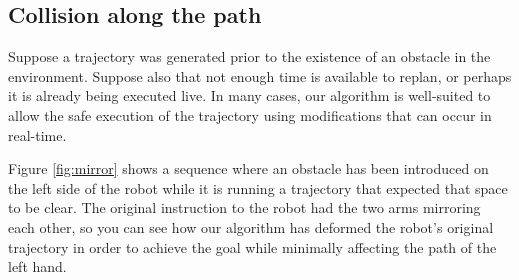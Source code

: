 \documentclass[letterpaper, 10 pt, conference]{ieeeconf}  %
\begin{document}
\subsection{Collision along the path}

Suppose a trajectory was generated prior to the existence of an obstacle in the environment. Suppose also that not enough time is available to replan, or perhaps it is already being executed live. In many cases, our algorithm is well-suited to allow the safe execution of the trajectory using modifications that can occur in real-time.

Figure \ref{fig:mirror} shows a sequence where an obstacle has been introduced on the left side of the robot while it is running a trajectory that expected that space to be clear. The original instruction to the robot had the two arms mirroring each other, so you can see how our algorithm has deformed the robot's original trajectory in order to achieve the goal while minimally affecting the path of the left hand.
\end{document}
